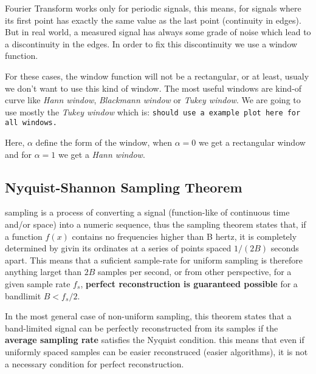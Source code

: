 \newp Fourier Transform works only for periodic signals, this means, for signals where its first point has exactly the same value as the last point (continuity in edges). But in real world, a measured signal has always some grade of noise which lead to a discontinuity in the edges. In order to fix this discontinuity we use a window function.

\newp For these cases, the window function will not be a rectangular, or at least, usualy we don't want to use this kind of window. The most useful windows are kind-of curve like \textit{Hann window}, \textit{Blackmann window} or \textit{Tukey window}. We are going to use mostly the \textit{Tukey window} which is: \texttt{should use a example plot here for all windows.}


\newp Here, $\alpha$ define the form of the window, when $\alpha=0$ we get a rectangular window and for $\alpha=1$ we get a \textit{Hann window}.
\subsection{Nyquist-Shannon Sampling Theorem}{\label{subsec_NSST}}
\newp sampling is a process of converting a signal (function-like of continuous time and/or space) into a numeric sequence, thus the sampling theorem states that, if a function $f(x)$ contains no frequencies higher than B hertz, it is completely determined by givin its ordinates at a series of points spaced $1/(2B)$ seconds apart. This means that a suficient sample-rate for uniform sampling is therefore anything larget than $2B$ samples per second, or from other perspective, for a given sample rate $f_s$, \textbf{perfect reconstruction is guaranteed possible} for a bandlimit $B < f_s/2$.

\newp In the most general case of non-uniform sampling, this theorem states that a band-limited signal can be perfectly reconstructed from its samples if the \textbf{average sampling rate} satisfies the Nyquist condition. this means that even if uniformly spaced samples can be easier reconstruced (easier algorithms), it is not a necessary condition for perfect reconstruction.

